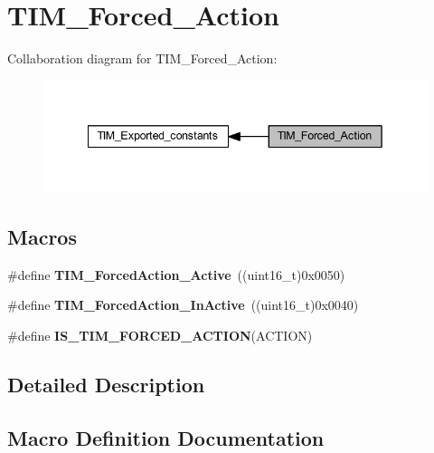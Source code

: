 \hypertarget{group___t_i_m___forced___action}{}\section{T\+I\+M\+\_\+\+Forced\+\_\+\+Action}
\label{group___t_i_m___forced___action}
Collaboration diagram for T\+I\+M\+\_\+\+Forced\+\_\+\+Action\+:\nopagebreak
\begin{figure}[H]
\begin{center}
\leavevmode
\includegraphics[width=342pt]{group___t_i_m___forced___action}
\end{center}
\end{figure}
\subsection*{Macros}
\begin{DoxyCompactItemize}
\item 
\mbox{\label{group___t_i_m___forced___action_ga19d3769825f1dfdbdbde3edb60310b99}} 
\#define {\bfseries T\+I\+M\+\_\+\+Forced\+Action\+\_\+\+Active}~((uint16\+\_\+t)0x0050)
\item 
\mbox{\label{group___t_i_m___forced___action_ga79656f2193ec5e12a15d0ae5b025d273}} 
\#define {\bfseries T\+I\+M\+\_\+\+Forced\+Action\+\_\+\+In\+Active}~((uint16\+\_\+t)0x0040)
\item 
\#define {\bfseries I\+S\+\_\+\+T\+I\+M\+\_\+\+F\+O\+R\+C\+E\+D\+\_\+\+A\+C\+T\+I\+ON}(A\+C\+T\+I\+ON)
\end{DoxyCompactItemize}


\subsection{Detailed Description}


\subsection{Macro Definition Documentation}
\mbox{\label{group___t_i_m___forced___action_gaa2cb16f281d32c95ab974dc5157bfa63}} 
